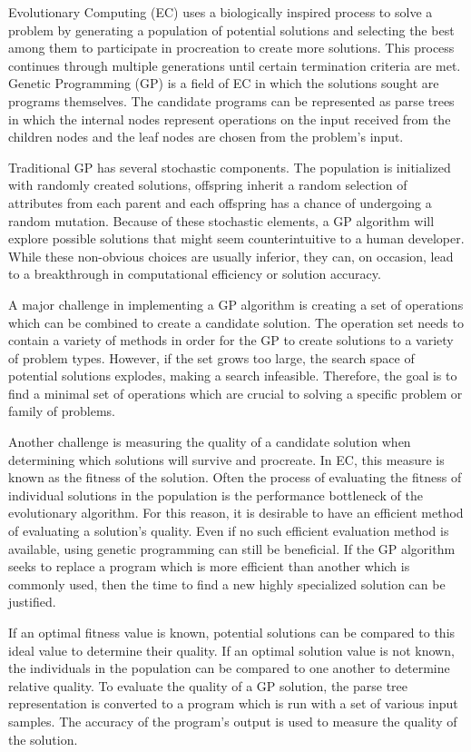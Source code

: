 \documentclass{article}
\begin{document}
Evolutionary Computing (EC) uses a biologically inspired process to solve a problem by generating a population of potential solutions and selecting the best among them to participate in procreation to create more solutions. This process continues through multiple generations until certain termination criteria are met. Genetic Programming (GP) is a field of EC in which the solutions sought are programs themselves. The candidate programs can be represented as parse trees in which the internal nodes represent operations on the input received from the children nodes and the leaf nodes are chosen from the problem's input.

Traditional GP has several stochastic components. The population is initialized with randomly created solutions, offspring inherit a random selection of attributes from each parent and each offspring has a chance of undergoing a random mutation. Because of these stochastic elements, a GP algorithm will explore possible solutions that might seem counterintuitive to a human developer. While these non-obvious choices are usually inferior, they can, on occasion, lead to a breakthrough in computational efficiency or solution accuracy.

A major challenge in implementing a GP algorithm is creating a set of operations which can be combined to create a candidate solution. The operation set needs to contain a variety of methods in order for the GP to create solutions to a variety of problem types. However, if the set grows too large, the search space of potential solutions explodes, making a search infeasible. Therefore, the goal is to find a minimal set of operations which are crucial to solving a specific problem or family of problems.

Another challenge is measuring the quality of a candidate solution when determining which solutions will survive and procreate. In EC, this measure is known as the fitness of the solution. Often the process of evaluating the fitness of individual solutions in the population is the performance bottleneck of the evolutionary algorithm. For this reason, it is desirable to have an efficient method of evaluating a solution's quality. Even if no such efficient evaluation method is available, using genetic programming can still be beneficial. If the GP algorithm seeks to replace a program which is more efficient than another which is commonly used, then the time to find a new highly specialized solution can be justified.

If an optimal fitness value is known, potential solutions can be compared to this ideal value to determine their quality. If an optimal solution value is not known, the individuals in the population can be compared to one another to determine relative quality. To evaluate the quality of a GP solution, the parse tree representation is converted to a program which is run with a set of various input samples. The accuracy of the program's output is used to measure the quality of the solution.
\end{document}

